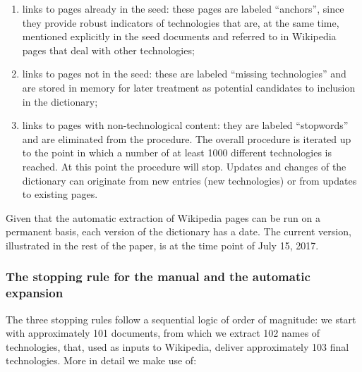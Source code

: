 \documentclass[b5paper,]{book}
\providecommand{\tightlist}{%
  \setlength{\itemsep}{0pt}\setlength{\parskip}{0pt}}
\theoremstyle{definition}
\theoremstyle{definition}
\theoremstyle{definition}
\theoremstyle{remark}
\begin{document}
\begin{enumerate}
\def\labelenumi{\alph{enumi}.}
\tightlist
\item
  links to pages already in the seed: these pages are labeled
  ``anchors'', since they provide robust indicators of technologies that
  are, at the same time, mentioned explicitly in the seed documents and
  referred to in Wikipedia pages that deal with other technologies;
\item
  links to pages not in the seed: these are labeled ``missing
  technologies'' and are stored in memory for later treatment as
  potential candidates to inclusion in the dictionary;
\item
  links to pages with non-technological content: they are labeled
  ``stopwords'' and are eliminated from the procedure. The overall
  procedure is iterated up to the point in which a number of at least
  1000 different technologies is reached. At this point the procedure
  will stop. Updates and changes of the dictionary can originate from
  new entries (new technologies) or from updates to existing pages.
\end{enumerate}

Given that the automatic extraction of Wikipedia pages can be run on a
permanent basis, each version of the dictionary has a date. The current
version, illustrated in the rest of the paper, is at the time point of
July 15, 2017.

\subsubsection*{The stopping rule for the manual and the automatic
expansion}\label{the-stopping-rule-for-the-manual-and-the-automatic-expansion}

The three stopping rules follow a sequential logic of order of
magnitude: we start with approximately 101 documents, from which we
extract 102 names of technologies, that, used as inputs to Wikipedia,
deliver approximately 103 final technologies. More in detail we make use
of:
\end{document}
